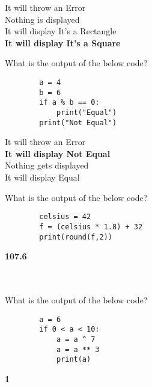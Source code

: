 \documentclass{exam}
\begin{document}
\begin{questions}
      \begin{oneparchoices}
          \choice It will throw an Error \\
          \choice Nothing is displayed \\
          \choice It will display It's a Rectangle \\
          \choice \textbf{It will display It's a Square}
      \end{oneparchoices}

      \question What is the output of the below code?

      \begin{verbatim}
        a = 4
        b = 6
        if a % b == 0:
            print("Equal")
        print("Not Equal")
      \end{verbatim}

      \begin{oneparchoices}
          \choice It will throw an Error \\
          \choice \textbf{It will display Not Equal} \\
          \choice  Nothing gets displayed \\
          \choice It will display Equal
      \end{oneparchoices}

      \question What is the output of the below code?

      \begin{verbatim}
        celsius = 42
        f = (celsius * 1.8) + 32
        print(round(f,2))
      \end{verbatim}

      \begin{oneparchoices}
        \choice \textbf{107.6} \\
         \\
         \\
      \end{oneparchoices}

      \question What is the output of the below code?

      \begin{verbatim}
        a = 6
        if 0 < a < 10:
            a = a ^ 7
            a = a ** 3
            print(a)
      \end{verbatim}
    
      \begin{oneparchoices}
          \choice \textbf{1} \\
           \\
           \\
      \end{oneparchoices}


\end{questions}
\end{document}
